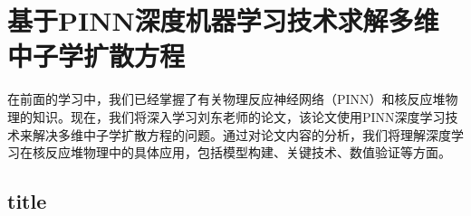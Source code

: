 \documentclass{Sichuan Normal University}
\begin{document}
\section{基于PINN深度机器学习技术求解多维中子学扩散方程}
在前面的学习中，我们已经掌握了有关物理反应神经网络（PINN）和核反应堆物理的知识。现在，我们将深入学习刘东老师的论文，该论文使用PINN深度学习技术来解决多维中子学扩散方程的问题。通过对论文内容的分析，我们将理解深度学习在核反应堆物理中的具体应用，包括模型构建、关键技术、数值验证等方面。
\subsection{title}







    
\end{document}
